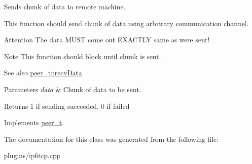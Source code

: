\-Sends chunk of data to remote machine. 

\-This function should send chunk of data using arbitrary communication channel. \begin{DoxyAttention}{\-Attention}
\-The data \-M\-U\-S\-T come out \-E\-X\-A\-C\-T\-L\-Y same as were sent! 
\end{DoxyAttention}
\begin{DoxyNote}{\-Note}
\-This function should block until chunk is sent. 
\end{DoxyNote}
\begin{DoxySeeAlso}{\-See also}
\hyperlink{classpeer__t_af0dec938065477f8b131e0d5a7c09513}{peer\-\_\-t\-::recv\-Data} 
\end{DoxySeeAlso}

\begin{DoxyParams}{\-Parameters}
{\em data} & \-Chunk of data to be sent. \\
\hline
\end{DoxyParams}
\begin{DoxyReturn}{\-Returns}
1 if sending succeeded, 0 if failed 
\end{DoxyReturn}


\-Implements \hyperlink{classpeer__t_a42902fbacfebd9773f4f7ad3527382be}{peer\-\_\-t}.



\-The documentation for this class was generated from the following file\-:\begin{DoxyCompactItemize}
\item 
plugins/ip6tcp.\-cpp\end{DoxyCompactItemize}
